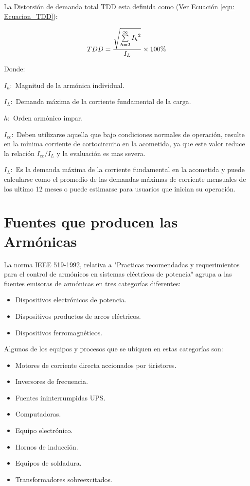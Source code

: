 La Distorsión de demanda total TDD esta definida como (Ver Ecuación \ref{eqn: Ecuacion_TDD}):

\begin{equation} \label{eqn: Ecuacion_TDD}
\small
    TDD = \frac{\sqrt{\sum\limits_{h=2}^{\infty}{{I_h}^{2}}}}{I_L} \times 100\%
\end{equation}

Donde:

$I_h:$ Magnitud de la armónica individual.

$I_L:$ Demanda máxima de la corriente fundamental de la carga.

$h:$ Orden armónico impar.

${I}_{cc}:$ Deben utilizarse aquella que bajo condiciones normales de operación, resulte en la mínima corriente de cortocircuito en la acometida, ya que este valor reduce la relación ${{I}_{cc}}/{I_L}$ y la evaluación es mas severa.

$I_L:$ Es la demanda máxima de la corriente fundamental en la acometida y puede calcularse como el promedio de las demandas máximas de corriente mensuales de los ultimo 12 meses o puede estimarse para usuarios que inician su operación.



\section{Fuentes que producen las Armónicas}

La norma IEEE 519-1992, relativa a "Practicas recomendadas y requerimientos para el control de armónicos en sistemas eléctricos de potencia" agrupa a las fuentes emisoras de armónicas en tres categorías diferentes:

\begin{itemize}
    \item Dispositivos electrónicos de potencia.
    \item Dispositivos productos de arcos eléctricos.
    \item Dispositivos ferromagnéticos.
\end{itemize}

Algunos de los equipos y procesos que se ubiquen en estas categorías son:

\begin{itemize}
    \item Motores de corriente directa accionados por tiristores.
    \item Inversores de frecuencia.
    \item Fuentes ininterrumpidas UPS.
    \item Computadoras.
    \item Equipo electrónico.
    \item Hornos de inducción.
    \item Equipos de soldadura.
    \item Transformadores sobreexcitados.
\end{itemize}



